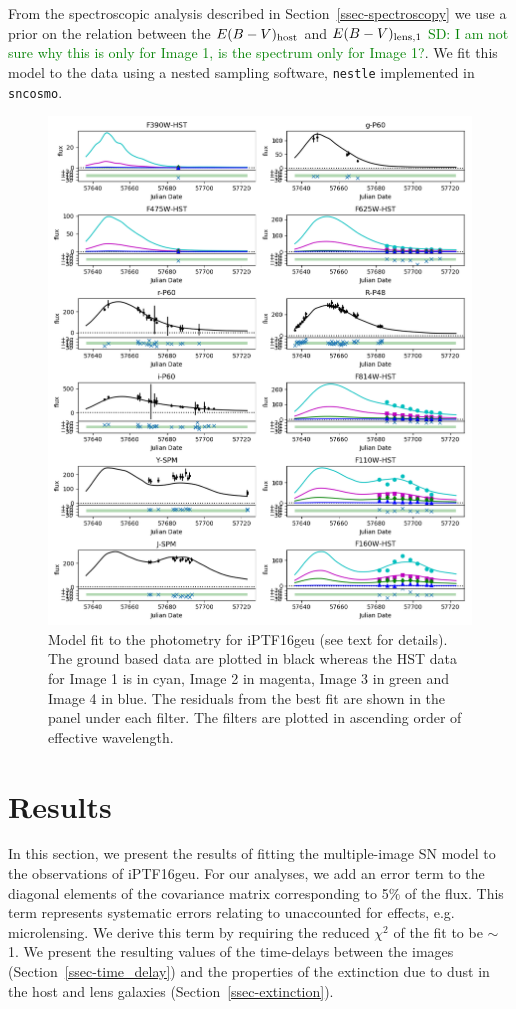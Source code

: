 \documentclass[a4paper,fleqn,usenatbib]{mnras}
\newcommand{\sd}[1]{\textcolor{green}{SD: #1}}
\begin{document}
From the spectroscopic analysis described in Section~\ref{ssec-spectroscopy}
we use a prior on the relation between the $E(B-V)_{\rm host}$  and $E(B-V)_{\rm lens, 1}$ \sd{I am not sure why this is only for Image 1, is the spectrum only for Image 1?}. We fit this model to the data using a nested sampling software, \texttt{nestle} implemented in \texttt{sncosmo}. 

\begin{figure}
    \centering
    \includegraphics[width=.9\textwidth]{16geu_lcfit.png}
    \caption{Model fit to the photometry for iPTF16geu (see text for details). The ground based data are plotted in black whereas the HST data for Image 1 is in cyan, Image 2 in magenta, Image 3 in green and Image 4 in blue. The residuals from the best fit are shown in the panel under each filter. The filters are plotted in ascending order of effective wavelength.}
    \label{fig:16geu_lc}
\end{figure}

\section{Results}
\label{sec:results}
In this section, we present the results of fitting the multiple-image SN model to the observations of iPTF16geu. For our analyses, we add an error term to the diagonal elements of the covariance matrix corresponding to 5$\%$ of the flux. This term represents systematic errors relating to unaccounted for effects, e.g. microlensing. We derive this term by requiring the reduced $\chi^2$ of the fit to be $\sim$ 1. 
 We present the resulting values of the time-delays between the images (Section~\ref{ssec-time_delay}) and the properties of the extinction due to dust in the host and lens galaxies (Section~\ref{ssec-extinction}). 
\end{document}
